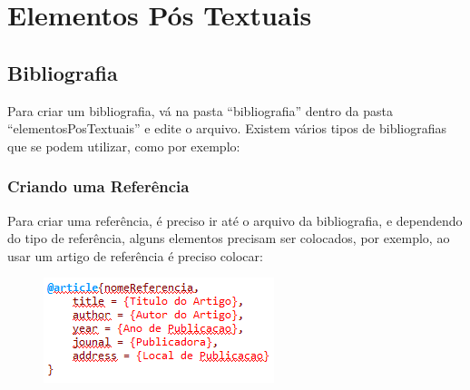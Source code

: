 \chapter{Elementos Pós Textuais}
\section{Bibliografia}

Para criar um bibliografia, vá na pasta ``bibliografia'' dentro da pasta ``elementosPosTextuais'' e edite o arquivo. Existem vários tipos de bibliografias que se podem utilizar, como por exemplo:

\begin{table}[htb]
\end{table}

\subsection{Criando uma Referência}
Para criar uma referência, é preciso ir até o arquivo da bibliografia, e dependendo do tipo de referência, alguns elementos precisam ser colocados, por exemplo, ao usar um artigo de referência é preciso colocar:

\begin{figure}[htb]
	\begin{center}
		\includegraphics[scale=1]{./Imagens/capitulo_3/code_1.png}
	\end{center}
\end{figure}

